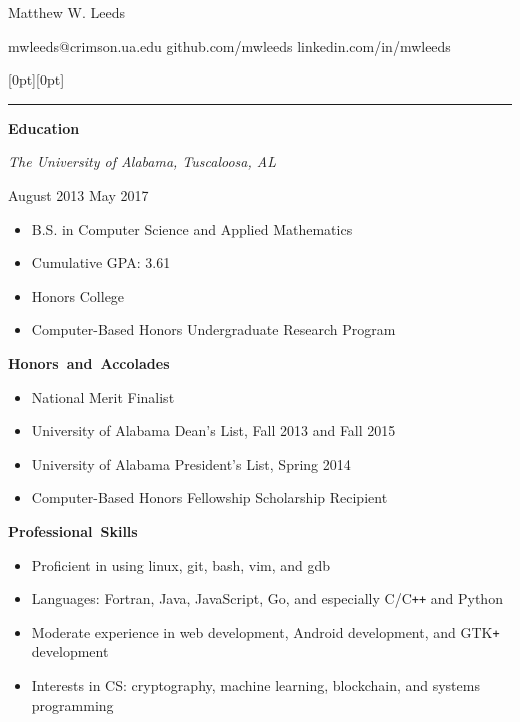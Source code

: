 \documentclass[11pt]{article}
\begin{document}
\centerline{\huge Matthew W. Leeds}
\vspace{0.4em}
\centerline{\normalsize mwleeds@crimson.ua.edu \space \textbar \space github.com/mwleeds \space \textbar \space linkedin.com/in/mwleeds}

\noindent \begin{minipage}[t]{\textwidth}
\raisebox{9pt}[0pt][0pt]{\rule{\textwidth}{0.2mm}\hspace{-\textwidth}}
\end{minipage}

\vspace{0.8em}
\hbox{\large \textbf{Education}}

\begin{minipage}[t]{0.65\textwidth}
\flushleft
\textit{The University of Alabama, Tuscaloosa, AL}\\
\end{minipage}
\begin{minipage}[t]{0.30\textwidth}
\flushright
August 2013 \space \textemdash \space May 2017\\
\end{minipage}

\begin{itemize}
  \item B.S. in Computer Science and Applied Mathematics
  \item Cumulative GPA: 3.61
  \item Honors College
  \item Computer-Based Honors Undergraduate Research Program
\end{itemize}

\vspace{0.8em}
\hbox{\large \textbf{Honors and Accolades}}

\begin{itemize}
  \item National Merit Finalist
  \item University of Alabama Dean's List, Fall 2013 and Fall 2015
  \item University of Alabama President's List, Spring 2014
  \item Computer-Based Honors Fellowship Scholarship Recipient
\end{itemize}

\vspace{0.8em}
\hbox{\large \textbf{Professional Skills}}

\begin{itemize}
  \item Proficient in using linux, git, bash, vim, and gdb
  \item Languages: Fortran, Java, JavaScript, Go, and especially C/C\texttt{++} and Python
  \item Moderate experience in web development, Android development, and GTK\texttt{+} development
  \item Interests in CS: cryptography, machine learning, blockchain, and systems programming
\end{itemize}
\end{document}
